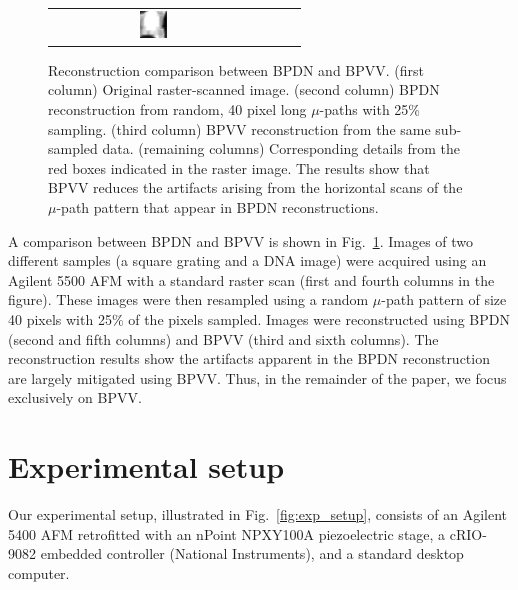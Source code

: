 \documentclass[twocolumn,oneside]{IEEEtran/IEEEtran}
\begin{document}
\begin{figure}[htbp]
\begin{tabular}{cccccc}
                                                                                                                                                       & \includegraphics[width=0.16\textwidth]{figures-SBA/dnaforbptv_bptv_40mu_zoomin}		
  \end{tabular}
  \caption{Reconstruction comparison between BPDN and BPVV. (first column)
    Original raster-scanned image. (second column) BPDN reconstruction from
    random, 40 pixel long $\mu$-paths with 25\% sampling. (third column) BPVV
    reconstruction from the same sub-sampled data. (remaining columns)
    Corresponding details from the red boxes indicated in the raster image. The
    results show that BPVV reduces the artifacts arising from the horizontal
    scans of the $\mu$-path pattern that appear in BPDN reconstructions.}
  \label{fig:BPTV_demonstration}
\end{figure}
\endgroup
		
A comparison between BPDN and BPVV is shown in
Fig.~\ref{fig:BPTV_demonstration}. Images of two different samples
(a square grating and a DNA image) were acquired using an Agilent 5500
AFM with a standard raster scan (first and fourth columns in the figure). These
images were then resampled using a random $\mu$-path pattern of size 40 pixels
with 25\% of the pixels sampled. Images were reconstructed using BPDN (second
and fifth columns) and BPVV (third and sixth columns). The reconstruction
results show the artifacts apparent in the BPDN reconstruction are largely
mitigated using BPVV. Thus, in the remainder of the paper, we focus exclusively on BPVV.
	

\section{Experimental setup} \label{sec:experimentalSetup}
Our experimental setup, illustrated in Fig.~\ref{fig:exp_setup},
consists of an Agilent 5400 AFM  retrofitted with an nPoint NPXY100A
piezoelectric stage, a cRIO-9082 embedded controller (National
Instruments), and a standard desktop computer. 
\end{document}

